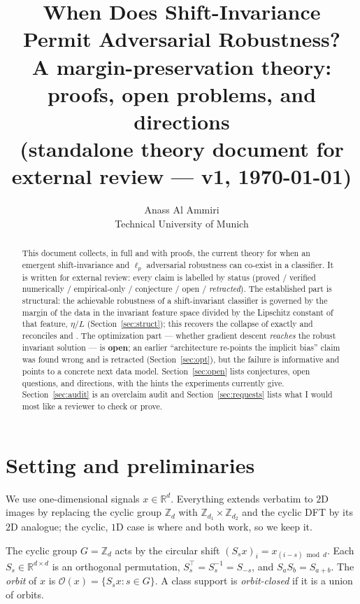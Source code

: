 \documentclass[11pt]{article}
\title{\textbf{When Does Shift-Invariance Permit Adversarial Robustness?}\\[2pt]
\large A margin-preservation theory: proofs, open problems, and directions\\[2pt]
\normalsize (standalone theory document for external review --- v1, \today)}
\author{Anass Al Ammiri \\ \small Technical University of Munich}
\date{}
\theoremstyle{plain}
\theoremstyle{definition}
\theoremstyle{remark}
\newcommand{\R}{\mathbb{R}}
\newcommand{\Z}{\mathbb{Z}}
\begin{document}
\maketitle

\begin{abstract}
\noindent This document collects, in full and with proofs, the current theory for when an emergent shift-invariance and $\ell_p$ adversarial robustness can co-exist in a classifier. It is written for external review: every claim is labelled by status (proved / verified numerically / empirical-only / conjecture / open / \emph{retracted}). The established part is structural: the achievable robustness of a shift-invariant classifier is governed by the margin of the data in the invariant feature space divided by the Lipschitz constant of that feature, $\eta/L$ (Section~\ref{sec:struct}); this recovers the collapse of \citet{ge2021shift} exactly and reconciles \citet{kamath2021canwehaveitall} and \citet{tramer2020fundamental}. The optimization part --- whether gradient descent \emph{reaches} the robust invariant solution --- is \textbf{open}; an earlier ``architecture re-points the implicit bias'' claim was found wrong and is retracted (Section~\ref{sec:opt}), but the failure is informative and points to a concrete next data model. Section~\ref{sec:open} lists conjectures, open questions, and directions, with the hints the experiments currently give. Section~\ref{sec:audit} is an overclaim audit and Section~\ref{sec:requests} lists what I would most like a reviewer to check or prove.
\end{abstract}

\tableofcontents

\section{Setting and preliminaries}\label{sec:prelim}
We use one-dimensional signals $x\in\R^{d}$. Everything extends verbatim to $2$D images by replacing the cyclic group $\Z_d$ with $\Z_{d_1}\times\Z_{d_2}$ and the cyclic DFT by its $2$D analogue; the cyclic, $1$D case is where \citet{ge2021shift} and \citet{kamath2021canwehaveitall} both work, so we keep it.

The cyclic group $G=\Z_d$ acts by the circular shift $(S_s x)_i = x_{(i-s)\bmod d}$. Each $S_s\in\R^{d\times d}$ is an orthogonal permutation, $S_s^\top=S_s^{-1}=S_{-s}$, and $S_aS_b=S_{a+b}$. The \emph{orbit} of $x$ is $\mathcal O(x)=\{S_sx:s\in G\}$. A class support is \emph{orbit-closed} if it is a union of orbits.
\end{document}
